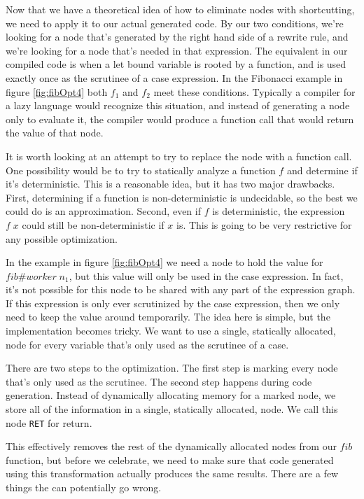 \documentclass{book}
\theoremstyle{definition}
\newcommand{\Varid}[1]{\mathit{#1}}
\begin{document}
Now that we have a theoretical idea of how to eliminate nodes with shortcutting,
we need to apply it to our actual generated code.
By our two conditions, we're looking for a node that's generated by the right hand side of a rewrite rule,
and we're looking for a node that's needed in that expression.
The equivalent in our compiled code is when a let bound variable is rooted by a function,
and is used exactly once as the scrutinee of a case expression.
In the Fibonacci example in figure \ref{fig:fibOpt4}
both $f_1$ and $f_2$ meet these conditions.
Typically a compiler for a lazy language would recognize this situation,
and instead of generating a node only to evaluate it, the compiler would produce a function call
that would return the value of that node.

It is worth looking at an attempt to try to replace the node with a function call.
One possibility would be to try to statically analyze a function \ensuremath{\Varid{f}} and determine if it's deterministic.
This is a reasonable idea, but it has two major drawbacks.
First, determining if a function is non-deterministic is undecidable,
so the best we could do is an approximation.
Second, even if \ensuremath{\Varid{f}} is deterministic, the expression \ensuremath{\Varid{f}\;\Varid{x}}
could still be non-deterministic if \ensuremath{\Varid{x}} is.
This is going to be very restrictive for any possible optimization.

In the example in figure \ref{fig:fibOpt4} we need a node to hold the value for \ensuremath{\Varid{fib}\#\Varid{worker}\;\Varid{n}_{\mathrm{1}}},
but this value will only be used in the case expression.
In fact, it's not possible for this node to be shared with any part of the expression graph.
If this expression is only ever scrutinized by the case expression,
then we only need to keep the value around temporarily.
The idea here is simple, but the implementation becomes tricky.
We want to use a single, statically allocated, node for every variable
that's only used as the scrutinee of a case.

There are two steps to the optimization.
The first step is marking every node that's only used as the scrutinee.
The second step happens during code generation.
Instead of dynamically allocating memory for a marked node,
we store all of the information in a single, statically allocated, node.
We call this node \texttt{RET} for return.

This effectively removes the rest of the dynamically allocated nodes from our \ensuremath{\Varid{fib}}
function, but before we celebrate, we need to make sure that 
code generated using this transformation actually produces the same results.
There are a few things the can potentially go wrong.
\end{document}
